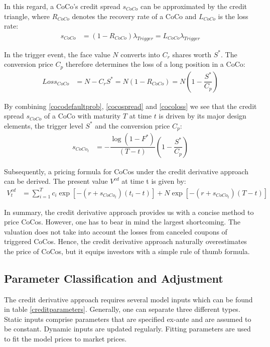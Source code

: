 In this regard, a CoCo's credit spread $s_{CoCo}$ can be approximated by the credit triangle, where $R_{CoCo}$ denotes the recovery rate of a CoCo and $L_{CoCo}$ is the loss rate:
\begin{align} \label{cocospread}
    s_{CoCo} &= \left(1 - R_{CoCo}\right) \lambda_{Trigger} = {L}_{CoCo} \lambda_{Trigger}
\end{align}

In the trigger event, the face value $N$ converts into $C_r$ shares worth $S^*$. The conversion price $C_p$ therefore determines the loss of a long position in a CoCo:
\begin{align} \label{cocoloss}
    {Loss}_{CoCo} &= N - C_r S^* = N \left(1 - R_{CoCo} \right) = N \left(1 - \dfrac{S^*}{C_p} \right)
\end{align} 

By combining \ref{cocodefaultprob}, \ref{cocospread} and \ref{cocoloss} we see that the credit spread $s_{CoCo}$ of a CoCo with maturity $T$ at time $t$ is driven by its major design elements, the trigger level $S^*$ and the conversion price $C_p$:
\begin{align}
s_{CoCo_t}&= - \dfrac{\log (1 - F^*)}{(T - t)} \left( 1 - \dfrac{S^*}{C_p} \right)
\end{align}

Subsequently, a pricing formula for CoCos under the credit derivative approach can be derived. The present value $V^{cd}$ at time t is given by:
\begin{align}
V^{cd}_t &= \sum^T_{i=1} c_i \exp\left[-(r + s_{CoCo_t}) (t_i - t)\right] + N \exp\left[-(r+s_{CoCo_t}) (T-t) \right]
\end{align}

In summary, the credit derivative approach provides us with a concise method to price CoCos. However, one has to bear in mind the largest shortcoming. The valuation does not take into account the losses from canceled coupons of triggered CoCos. Hence, the credit derivative approach naturally overestimates the price of CoCos, but it equips investors with a simple rule of thumb formula. 

\subsection{Parameter Classification and Adjustment} \label{creditparameterssection}
The credit derivative approach requires several model inputs which can be found in table \ref{creditparameters}. Generally, one can separate three different types. Static inputs comprise parameters that are specified ex-ante and are assumed to be constant. Dynamic inputs are updated regularly. Fitting parameters are used to fit the model prices to market prices. \citep{wilkens2014contingent}

